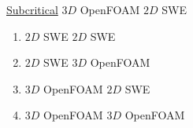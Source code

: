 \begin{frame}
\begin{minipage}{0.5\textwidth}
\centering
\Large \underline{Subcritical} $3D$ OpenFOAM    $2D$ SWE 
\end{minipage}
\hspace{4cm}
\begin{minipage}{0.21\textwidth}
\vspace{-1.5cm}
{\scriptsize
\begin{tcolorbox}[colframe=black, colback=white] 
\setlength{\leftmargini}{0pt}
\begin{enumerate}
\item[] {\color{black!20}$2D$ SWE    $2D$ SWE}
\item[] {\color{black!60}$2D$ SWE    $3D$ OpenFOAM}  
\item[] {$3D$ OpenFOAM     $2D$ SWE}
\item[] {\color{black!20}$3D$ OpenFOAM     $3D$ OpenFOAM}
\end{enumerate}
\end{tcolorbox}}
\end{minipage}


\end{frame}
